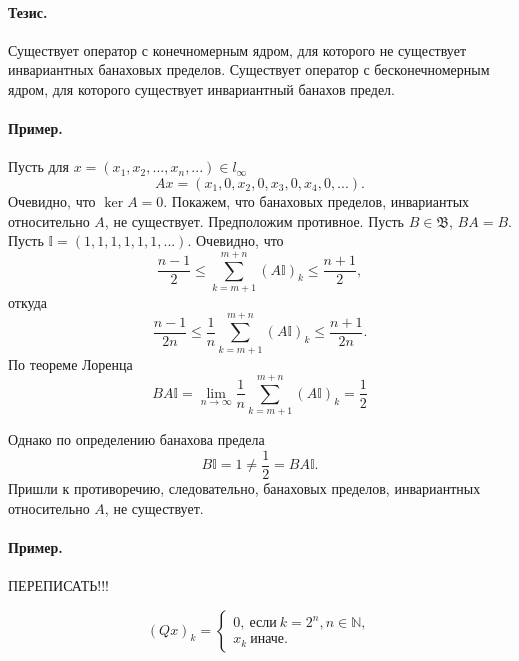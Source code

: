 \documentclass[a4paper,14pt]{article} %
\begin{document}

\paragraph{Тезис.}
Существует оператор с конечномерным ядром, для которого не существует инвариантных банаховых пределов.
Существует оператор с бесконечномерным ядром, для которого существует инвариантный банахов предел.

\paragraph{Пример.}

Пусть для $x = (x_1, x_2, ..., x_n, ...)\in l_\infty$
\begin{equation}
	Ax = (x_1, 0, x_2, 0, x_3, 0, x_4, 0, ...).
\end{equation}
Очевидно, что $\ker A = {0}$.
Покажем, что банаховых пределов, инвариантых относительно $A$, не существует.
Предположим противное.
Пусть $B\in\mathfrak{B}$, $BA = B$.
Пусть $\mathbb{I} = (1, 1, 1, 1, 1, 1, ...)$.
Очевидно, что
%
\begin{equation}
	\frac{n-1}{2}\leqslant \sum_{k=m+1}^{m+n} (A\mathbb{I})_k \leqslant \frac{n+1}{2},
\end{equation}
откуда
\begin{equation}
	\frac{n-1}{2n}\leqslant \frac{1}{n}\sum_{k=m+1}^{m+n} (A\mathbb{I})_k \leqslant \frac{n+1}{2n}.
\end{equation}
По теореме Лоренца
\begin{equation}
	BA\mathbb{I} = 
	\lim_{n\to\infty} \frac{1}{n}\sum_{k=m+1}^{m+n} (A\mathbb{I})_k = \frac{1}{2}
\end{equation}

Однако по определению банахова предела
\begin{equation}
	B\mathbb{I} = 1 \neq \frac{1}{2} = BA\mathbb{I}.
\end{equation}
Пришли к противоречию, следовательно, банаховых пределов, инвариантных относительно $A$, не существует.


\paragraph{Пример.}

ПЕРЕПИСАТЬ!!!

\begin{equation}
	(Qx)_k =
	\begin{cases}
		0,~\mbox{если}~ k = 2^n, n \in\mathbb{N},
		\\
		x_k~\mbox{иначе.}
	\end{cases}
\end{equation}
\end{document}
